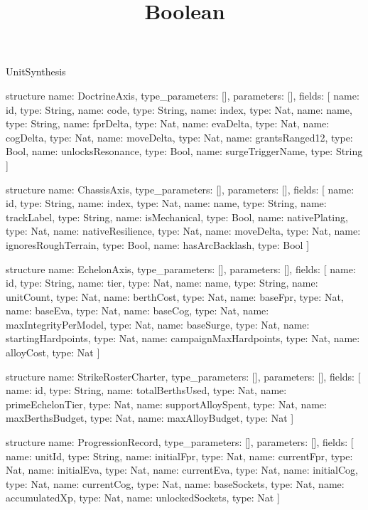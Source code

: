 \begin{lexlean}{UnitSynthesis}
\title{Boolean}
\begin{semanticmodule}
structure{
  name: DoctrineAxis,
  type_parameters: [],
  parameters: [],
  fields: [
    {name: id, type: String},
    {name: code, type: String},
    {name: index, type: Nat},
    {name: name, type: String},
    {name: fprDelta, type: Nat},
    {name: evaDelta, type: Nat},
    {name: cogDelta, type: Nat},
    {name: moveDelta, type: Nat},
    {name: grantsRanged12, type: Bool},
    {name: unlocksResonance, type: Bool},
    {name: surgeTriggerName, type: String}
  ]
}

structure{
  name: ChassisAxis,
  type_parameters: [],
  parameters: [],
  fields: [
    {name: id, type: String},
    {name: index, type: Nat},
    {name: name, type: String},
    {name: trackLabel, type: String},
    {name: isMechanical, type: Bool},
    {name: nativePlating, type: Nat},
    {name: nativeResilience, type: Nat},
    {name: moveDelta, type: Nat},
    {name: ignoresRoughTerrain, type: Bool},
    {name: hasArcBacklash, type: Bool}
  ]
}

structure{
  name: EchelonAxis,
  type_parameters: [],
  parameters: [],
  fields: [
    {name: id, type: String},
    {name: tier, type: Nat},
    {name: name, type: String},
    {name: unitCount, type: Nat},
    {name: berthCost, type: Nat},
    {name: baseFpr, type: Nat},
    {name: baseEva, type: Nat},
    {name: baseCog, type: Nat},
    {name: maxIntegrityPerModel, type: Nat},
    {name: baseSurge, type: Nat},
    {name: startingHardpoints, type: Nat},
    {name: campaignMaxHardpoints, type: Nat},
    {name: alloyCost, type: Nat}
  ]
}

structure{
  name: StrikeRosterCharter,
  type_parameters: [],
  parameters: [],
  fields: [
    {name: id, type: String},
    {name: totalBerthsUsed, type: Nat},
    {name: primeEchelonTier, type: Nat},
    {name: supportAlloySpent, type: Nat},
    {name: maxBerthsBudget, type: Nat},
    {name: maxAlloyBudget, type: Nat}
  ]
}

structure{
  name: ProgressionRecord,
  type_parameters: [],
  parameters: [],
  fields: [
    {name: unitId, type: String},
    {name: initialFpr, type: Nat},
    {name: currentFpr, type: Nat},
    {name: initialEva, type: Nat},
    {name: currentEva, type: Nat},
    {name: initialCog, type: Nat},
    {name: currentCog, type: Nat},
    {name: baseSockets, type: Nat},
    {name: accumulatedXp, type: Nat},
    {name: unlockedSockets, type: Nat}
  ]
}


\end{semanticmodule}
\end{lexlean}

